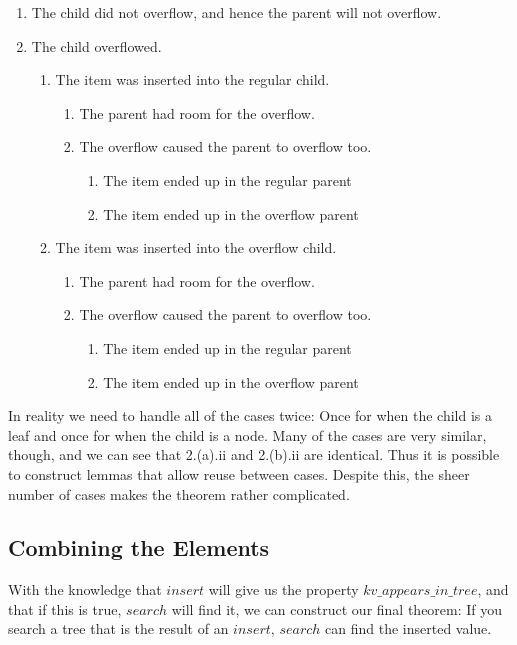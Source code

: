 \begin{enumerate}
  \item The child did not overflow, and hence the parent will not overflow. 
  \item The child overflowed.
  \begin{enumerate}
    \item The item was inserted into the regular child.
    \begin{enumerate}
      \item The parent had room for the overflow.
      \item The overflow caused the parent to overflow too.
      \begin{enumerate}
        \item The item ended up in the regular parent
        \item The item ended up in the overflow parent
      \end{enumerate}
    \end{enumerate}
    \item The item was inserted into the overflow child.
    \begin{enumerate}
      \item The parent had room for the overflow.
      \item The overflow caused the parent to overflow too.
      \begin{enumerate}
        \item The item ended up in the regular parent
        \item The item ended up in the overflow parent
      \end{enumerate}
    \end{enumerate}
  \end{enumerate}
\end{enumerate}

In reality we need to handle all of the cases twice: Once for when the child is a leaf and once for when the child is a node. Many of the cases are very similar, though, and we can see that 2.(a).ii and 2.(b).ii are identical. Thus it is possible to construct lemmas that allow reuse between cases. Despite this, the sheer number of cases makes the theorem rather complicated. 

\subsection{Combining the Elements}
\label{subsec:CombiningTheElements}
With the knowledge that $insert$ will give us the property $kv\_appears\_in\_tree$, and that if this is true, $search$ will find it, we can construct our final theorem: If you search a tree that is the result of an $insert$, $search$ can find the inserted value. 

